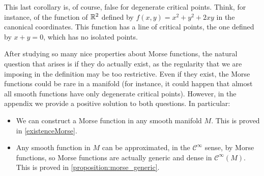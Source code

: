 \begin{rmrk}
This last corollary is, of course, false for degenerate critical points. Think, for instance, of the function of $\mathbb{R}^2$ defined by $f(x,y) = x^2+y^2+2xy$ in the canonical coordinates. This function has a line of critical points, the one defined by $x + y = 0$, which has no isolated points.
\end{rmrk}

After studying so many nice properties about Morse functions, the natural question that arises is if they do actually exist, as the regularity that we are imposing in the definition may be too restrictive. Even if they exist, the Morse functions could be rare in a manifold (for instance, it could happen that almost all smooth functions have only degenerate critical points). However, in the appendix we provide a positive solution to both questions. In particular:

\begin{itemize}
	\item We can construct a Morse function in any smooth manifold $M$. This is proved in \ref{existenceMorse}.
	\item Any smooth function in $M$ can be approximated, in the $\mathcal{C}^{\infty}$ sense, by Morse functions, so Morse functions are actually generic and dense in $\mathcal{C}^{\infty}(M)$. This is proved in \ref{proposition:morse_generic}.
\end{itemize}
